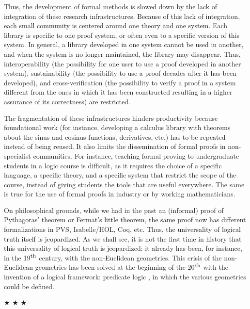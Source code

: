 Thus, the development of formal methods is slowed down by the lack of
integration of these research infrastructures.  Because of this lack
of integration, each small community is centered around one theory and
one system. Each library is specific to one proof system, or often
even to a specific version of this system. In general, a library
developed in one system cannot be used in another, and when the system
is no longer maintained, the library may disappear.  Thus,
interoperability (the possibility for one user to use a proof
developed in another system), sustainability (the possibility to use a
proof decades after it has been developed), and cross-verification
(the possibility to verify a proof in a system different from the ones in
which it has been constructed resulting in a higher assurance of its
correctness) are restricted.

The fragmentation of these infrastructures hinders productivity
because foundational work (for instance, developing a calculus library
with theorems about the sinus and cosinus functions, derivatives,
etc.) has to be repeated instead of being reused.  It also limits the
dissemination of formal proofs in non-specialist communities. For
instance, teaching formal proving to undergraduate students in a logic
course is difficult, as it requires the choice of a specific language,
a specific theory, and a specific system that restrict the scope of the
course, instead of giving students the tools that are useful
everywhere. The same is true for the use of formal proofs in industry
or by working mathematicians.

On philosophical grounds, while we had in the past an (informal) proof
of Pythagoras' theorem or Fermat's little theorem, the same proof now
has different formalizations in PVS, Isabelle/HOL, Coq, etc.  Thus,
the universality of logical truth itself is jeopardized.  As we shall
see, it is not the first time in history that this universality of
logical truth is jeopardized: it already has been, for instance, in
the 19$^{\mbox{\footnotesize th}}$ century, with the non-Euclidean
geometries. This crisis of the non-Euclidean geometries has been
solved at the beginning of the 20$^{\mbox{\footnotesize th}}$ with the
invention of a logical framework: predicate logic
\cite{HilbertAckermann}, in which the various geometries could be
defined.

\begin{center}
$\bigstar$ $\bigstar$ $\bigstar$
\end{center}


